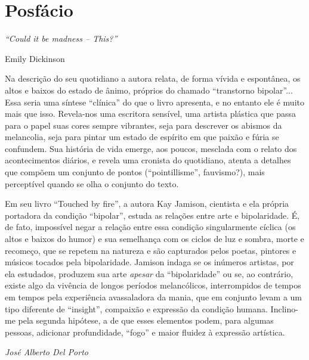 \chapter{Posfácio}

\epigraph{\textit{``Could it be madness -- This?''}}{Emily Dickinson}

Na descrição do seu quotidiano a autora relata, de forma vívida e
espontânea, os altos e baixos do estado de ânimo, próprios do chamado
``transtorno bipolar''... Essa seria uma síntese ``clínica'' do que o
livro apresenta, e no entanto ele é muito mais que isso. Revela-nos uma
escritora sensível, uma artista plástica que passa para o papel suas
cores sempre vibrantes, seja para descrever os abismos da melancolia,
seja para pintar um estado de espírito em que paixão e fúria se
confundem. Sua história de vida emerge, aos poucos, mesclada com o
relato dos acontecimentos diários, e revela uma cronista do quotidiano,
atenta a detalhes que compõem um conjunto de pontos (``pointillisme'',
fauvismo?), mais perceptível quando se olha o conjunto do texto.

Em seu livro ``Touched by fire'', a autora Kay Jamison, cientista e ela
própria portadora da condição ``bipolar'', estuda as relações entre arte
e bipolaridade. É, de fato, impossível negar a relação entre essa
condição singularmente cíclica (os altos e baixos do humor) e sua
semelhança com os ciclos de luz e sombra, morte e recomeço, que se
repetem na natureza e são capturados pelos poetas, pintores e músicos
tocados pela bipolaridade. Jamison indaga se os inúmeros artistas, por
ela estudados, produzem sua arte \emph{apesar} da ``bipolaridade'' ou
se, ao contrário, existe algo da vivência de longos períodos
melancólicos, interrompidos de tempos em tempos pela experiência
avassaladora da mania, que em conjunto levam a um tipo diferente de
``insight'', compaixão e expressão da condição humana. Inclino-me pela
segunda hipótese, a de que esses elementos podem, para algumas pessoas,
adicionar profundidade, ``fogo'' e maior fluidez à expressão artística.

{\bigskip\itshape\hfill {José Alberto Del Porto}}\medskip

